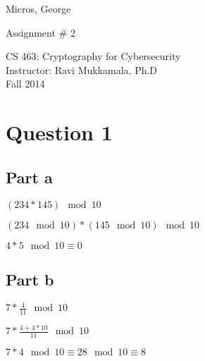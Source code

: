 \documentclass[11pt]{article}
\begin{document}
\begin{titlepage}    
\begin{flushright}
\vspace*{.5in}



\Large{ \sc Micros, George\\ }


\vspace*{.5in}

\Large{Assignment \# 2\\}


\vspace{1in}
\Large{\sc CS 463: Cryptography for Cybersecurity\\ Instructor: Ravi Mukkamala, Ph.D \\ Fall 2014 }




\vspace{.5cm}




\vspace {7cm}


\end{flushright}
\end{titlepage}



\section{\sc Question 1}

\subsection{Part a}

\begin{flushleft}
$(234*145) \mod 10$

$(234 \mod 10)*(145 \mod 10) \mod 10$

$ 4*5 \mod 10 \equiv 0 $

\end{flushleft}


\subsection{Part b}

\begin{flushleft}
$ 7*\frac{4}{11} \mod 10$

$ 7 * \frac{4 + 4*10}{11} \mod 10$

$ 7*4 \mod 10  \equiv  28 \mod 10 \equiv8 $

\end{flushleft}
\end{document}
